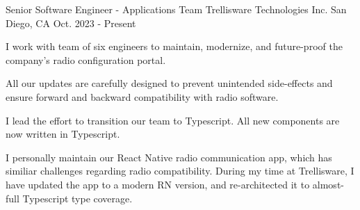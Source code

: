 

\begin{cventries}

  \cventry
    {Senior Software Engineer - Applications Team}
    {
      \hspace{0.7em}Trellisware Technologies Inc.
    }
    {San Diego, CA}
    {Oct. 2023 - Present}
    {\begin{cvitems}
      \item {
        I work with team of six engineers to maintain, modernize, and
        future-proof the company's radio configuration portal.
      }
      \item {
        All our updates are carefully designed to prevent unintended
        side-effects and ensure forward and backward compatibility with radio
        software.
      }
      \item{I lead the effort to transition our team to Typescript. All new components are now written in Typescript.}
      \item{
        I personally maintain our React Native radio communication app,
        which has similiar challenges regarding radio compatibility. 
        \newline
        During my time at Trellisware, I have updated the app to a modern RN
        version, and re-architected it to almost-full Typescript type coverage.
      }
    \end{cvitems}}


\end{cventries}
